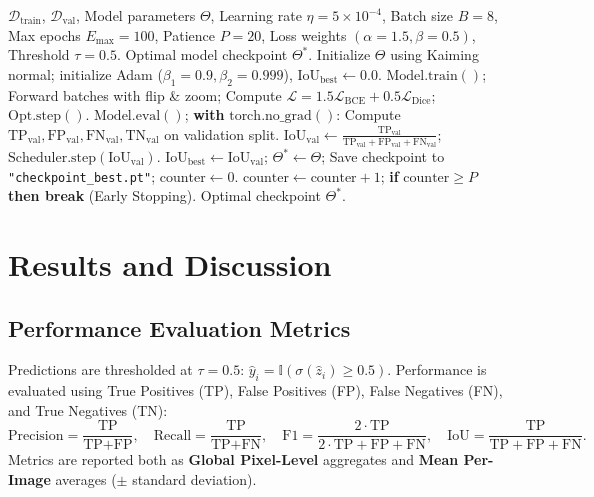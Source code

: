 \documentclass[10pt,a4paper]{report}
\begin{document}
\begin{algorithm}[htbp]
\caption{End-to-End U-Net Training and Validation Pipeline with Early Stopping}
\label{alg:training_pipeline}
\begin{algorithmic}[1]
\Require $\mathcal{D}_{\text{train}}$, $\mathcal{D}_{\text{val}}$, Model parameters $\Theta$, Learning rate $\eta=5\times 10^{-4}$, Batch size $B=8$, Max epochs $E_{\max}=100$, Patience $P=20$, Loss weights $(\alpha=1.5, \beta=0.5)$, Threshold $\tau = 0.5$.
\Ensure Optimal model checkpoint $\Theta^*$.
\State Initialize $\Theta$ using Kaiming normal; initialize Adam ($\beta_1=0.9, \beta_2=0.999$), $\text{IoU}_{\text{best}} \gets 0.0$.
    \State $\text{Model}.\text{train}()$; Forward batches with flip \& zoom; Compute $\mathcal{L} = 1.5\mathcal{L}_{\text{BCE}} + 0.5\mathcal{L}_{\text{Dice}}$; $\text{Opt}.\text{step}()$.
    \State $\text{Model}.\text{eval}()$; \textbf{with } $\text{torch}.\text{no\_grad}()$: Compute $\text{TP}_{\text{val}}, \text{FP}_{\text{val}}, \text{FN}_{\text{val}}, \text{TN}_{\text{val}}$ on validation split.
    \State $\text{IoU}_{\text{val}} \gets \frac{\text{TP}_{\text{val}}}{\text{TP}_{\text{val}} + \text{FP}_{\text{val}} + \text{FN}_{\text{val}}}$; $\text{Scheduler}.\text{step}(\text{IoU}_{\text{val}})$.
        \State $\text{IoU}_{\text{best}} \gets \text{IoU}_{\text{val}}$; $\Theta^* \gets \Theta$; Save checkpoint to \texttt{"checkpoint\_best.pt"}; $\text{counter} \gets 0$.
    \Else
        \State $\text{counter} \gets \text{counter} + 1$; \textbf{if } $\text{counter} \ge P$ \textbf{then break} (Early Stopping).
    \EndIf
\EndFor
\State \Return Optimal checkpoint $\Theta^*$.
\end{algorithmic}
\end{algorithm}

\chapter{Results and Discussion}
\label{chap:results_discussion}

\section{Performance Evaluation Metrics}
Predictions are thresholded at $\tau = 0.5$: $\hat{y}_i = \mathbb{I}(\sigma(\hat{z}_i) \ge 0.5)$. Performance is evaluated using True Positives (TP), False Positives (FP), False Negatives (FN), and True Negatives (TN):
\begin{equation}
\text{Precision} = \frac{\text{TP}}{\text{TP} + \text{FP}}, \quad
\text{Recall} = \frac{\text{TP}}{\text{TP} + \text{FN}}, \quad
\text{F1} = \frac{2\cdot \text{TP}}{2\cdot \text{TP} + \text{FP} + \text{FN}}, \quad
\text{IoU} = \frac{\text{TP}}{\text{TP} + \text{FP} + \text{FN}}.
\end{equation}
Metrics are reported both as \textbf{Global Pixel-Level} aggregates and \textbf{Mean Per-Image} averages ($\pm$ standard deviation).
\end{document}
